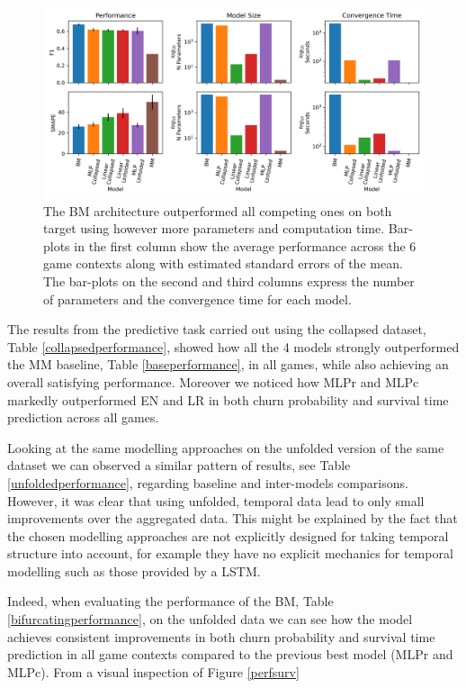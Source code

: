 \begin{figure}[h]
\centering
\includegraphics[width=.8\textwidth]{images/chapter_3/global_31.png}
\caption[\textbf{Aggregated comparison of models' performance}]{The BM architecture outperformed all competing ones on both target using however more parameters and computation time. Bar-plots in the first column show the average performance across the 6 game contexts along with estimated standard errors of the mean. The bar-plots on the second and third columns express the number of parameters and the convergence time for each model.}
\label{model_comp_coll_31} 
\end{figure}

The results from the predictive task carried out using the collapsed dataset, Table \ref{collapsedperformance}, showed how all the 4 models strongly outperformed the MM baseline, Table \ref{baseperformance}, in all games, while also achieving an overall satisfying performance. Moreover we noticed how MLPr and MLPc markedly outperformed EN and LR in both churn probability and survival time prediction across all games.  

Looking at the same modelling approaches on the unfolded version of the same dataset we can observed a similar pattern of results, see Table \ref{unfoldedperformance}, regarding baseline and inter-models comparisons. However, it was clear that using unfolded, temporal data lead to only small improvements over the aggregated data. This might be explained by the fact that the chosen modelling approaches are not explicitly designed for taking temporal structure into account, for example they have no explicit mechanics for temporal modelling such as those provided by a LSTM.

Indeed, when evaluating the performance of the BM, Table \ref{bifurcatingperformance}, on the unfolded data we can see how the model achieves consistent improvements in both churn probability and survival time prediction in all game contexts compared to the previous best model (MLPr and MLPc). From a visual inspection of Figure \ref{perfsurv} 
